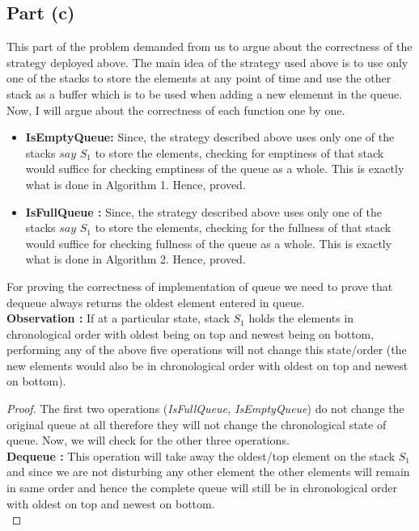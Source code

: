 \documentclass{article}
\begin{document}
{    \subsection {Part (c)} {
        This part of the problem demanded from us to argue about the correctness of the strategy deployed above. The main idea of the strategy used above is to use only one of the stacks to store the elements at any point of time and use the other stack as a buffer which is to be used when adding a new elemennt in the queue. Now, I will argue about the correctness of each function one by one. 
        \begin{itemize}
        \item \textbf{IsEmptyQueue:} Since, the strategy described above uses only one of the stacks $say$ $S_1$ to store the elements, checking for emptiness of that stack would suffice for checking emptiness of the queue as a whole. This is exactly what is done in Algorithm 1. Hence, proved. \hfill \qedsymbol 
        \item \textbf{IsFullQueue :} Since, the strategy described above uses only one of the stacks $say$ $S_1$ to store the elements, checking for the fullness of that stack would suffice for checking fullness of the queue as a whole. This is exactly what is done in Algorithm 2. Hence, proved. \hfill \qedsymbol
        \end {itemize}
        For proving the correctness of implementation of queue we need to prove that dequeue always returns the oldest element entered in queue. \newline \\
        \textbf{Observation :} If at a particular state, stack $S_1$ holds the elements in chronological order with oldest being on top and newest being on bottom, performing any of the above five operations will not change this state/order (the new elements would also be in chronological order with oldest on top and newest on bottom).
        \begin {proof}
        The first two operations (\emph{IsFullQueue, IsEmptyQueue}) do not change the original queue at all therefore they will not change the chronological state of queue. Now, we will check for the other three operations.\\
        \textbf {Dequeue :} This operation will take away the oldest/top element on the stack $S_1$ and since we are not disturbing any other element the other elements will remain in same order and hence the complete queue will still be in chronological order with oldest on top and newest on bottom.\\

\end{proof}}}
\end{document}
